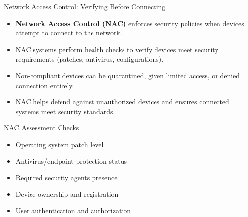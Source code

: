 \documentclass{beamer}
\begin{document}
                        \begin{frame}{Network Access Control: Verifying Before Connecting}
                        \begin{itemize}
                            \item \textbf{Network Access Control (NAC)} enforces security policies when devices attempt to connect to the network.
                            \item NAC systems perform health checks to verify devices meet security requirements (patches, antivirus, configurations).
                            \item Non-compliant devices can be quarantined, given limited access, or denied connection entirely.
                            \item NAC helps defend against unauthorized devices and ensures connected systems meet security standards.
                        \end{itemize}
                        
                        \begin{exampleblock}{NAC Assessment Checks}
                        \begin{itemize}
                            \item Operating system patch level
                            \item Antivirus/endpoint protection status
                            \item Required security agents presence
                            \item Device ownership and registration
                            \item User authentication and authorization
                        \end{itemize}
                        \end{exampleblock}
                        \end{frame}
                        
\end{document}
